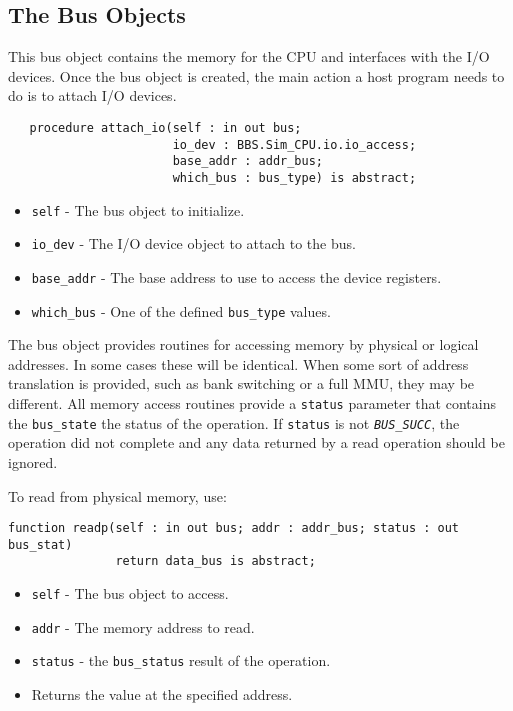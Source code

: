 \documentclass[10pt, openany]{book}
\newcommand{\constant}[1]{\emph{\texttt{#1}}}
\newcommand{\keyword}[1]{\texttt{#1}}
\newcommand{\datatype}[1]{\texttt{#1}}
\begin{document}
\subsection{The Bus Objects}
This bus object contains the memory for the CPU and interfaces with the I/O devices.  Once the bus object is created, the main action a host program needs to do is to attach I/O devices.
\begin{lstlisting}
   procedure attach_io(self : in out bus;
                       io_dev : BBS.Sim_CPU.io.io_access;
                       base_addr : addr_bus;
                       which_bus : bus_type) is abstract;
\end{lstlisting}
\begin{itemize}
  \item \keyword{self} - The bus object to initialize.
  \item \keyword{io\_dev} - The I/O device object to attach to the bus.
  \item \keyword{base\_addr} - The base address to use to access the device registers.
  \item \keyword{which\_bus} - One of the defined \datatype{bus\_type} values.
\end{itemize}

The bus object provides routines for accessing memory by physical or logical addresses.  In some cases these will be identical.  When some sort of address translation is provided, such as bank switching or a full MMU, they may be different.  All memory access routines provide a \keyword{status} parameter that contains the \datatype{bus\_state} the status of the operation.  If \keyword{status} is not \constant{BUS\_SUCC}, the operation did not complete and any data returned by a read operation should be ignored.

To read from physical memory, use:
\begin{lstlisting}
function readp(self : in out bus; addr : addr_bus; status : out bus_stat)
               return data_bus is abstract;
\end{lstlisting}
\begin{itemize}
  \item \keyword{self} - The bus object to access.
  \item \keyword{addr} - The memory address to read.
  \item \keyword{status} - the \datatype{bus\_status} result of the operation.
  \item Returns the value at the specified address.
\end{itemize}
\end{document}
